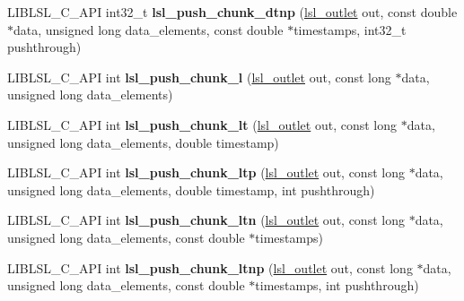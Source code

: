\begin{DoxyCompactItemize}
\item 
\mbox{\label{namespacelsl_a8a0e5cfc6b88e4dae3d4abd97ac47c38}} 
L\+I\+B\+L\+S\+L\+\_\+\+C\+\_\+\+A\+PI int32\+\_\+t {\bfseries lsl\+\_\+push\+\_\+chunk\+\_\+dtnp} (\hyperlink{namespacelsl_abcf512b0f66dacf86c10b165995fd50b}{lsl\+\_\+outlet} out, const double $\ast$data, unsigned long data\+\_\+elements, const double $\ast$timestamps, int32\+\_\+t pushthrough)
\item 
\mbox{\label{namespacelsl_a68403934d1fdace37348c95f54367bc2}} 
L\+I\+B\+L\+S\+L\+\_\+\+C\+\_\+\+A\+PI int {\bfseries lsl\+\_\+push\+\_\+chunk\+\_\+l} (\hyperlink{namespacelsl_abcf512b0f66dacf86c10b165995fd50b}{lsl\+\_\+outlet} out, const long $\ast$data, unsigned long data\+\_\+elements)
\item 
\mbox{\label{namespacelsl_a55622b4fc53149f986414f7642baf00a}} 
L\+I\+B\+L\+S\+L\+\_\+\+C\+\_\+\+A\+PI int {\bfseries lsl\+\_\+push\+\_\+chunk\+\_\+lt} (\hyperlink{namespacelsl_abcf512b0f66dacf86c10b165995fd50b}{lsl\+\_\+outlet} out, const long $\ast$data, unsigned long data\+\_\+elements, double timestamp)
\item 
\mbox{\label{namespacelsl_a1a6be2ac3bc8a1df1f4c08d0b3a79445}} 
L\+I\+B\+L\+S\+L\+\_\+\+C\+\_\+\+A\+PI int {\bfseries lsl\+\_\+push\+\_\+chunk\+\_\+ltp} (\hyperlink{namespacelsl_abcf512b0f66dacf86c10b165995fd50b}{lsl\+\_\+outlet} out, const long $\ast$data, unsigned long data\+\_\+elements, double timestamp, int pushthrough)
\item 
\mbox{\label{namespacelsl_a93cfea6f1ecc01606e6e4f37bba7103f}} 
L\+I\+B\+L\+S\+L\+\_\+\+C\+\_\+\+A\+PI int {\bfseries lsl\+\_\+push\+\_\+chunk\+\_\+ltn} (\hyperlink{namespacelsl_abcf512b0f66dacf86c10b165995fd50b}{lsl\+\_\+outlet} out, const long $\ast$data, unsigned long data\+\_\+elements, const double $\ast$timestamps)
\item 
\mbox{\label{namespacelsl_aa172a29d0976aee8d41306d7b8b53231}} 
L\+I\+B\+L\+S\+L\+\_\+\+C\+\_\+\+A\+PI int {\bfseries lsl\+\_\+push\+\_\+chunk\+\_\+ltnp} (\hyperlink{namespacelsl_abcf512b0f66dacf86c10b165995fd50b}{lsl\+\_\+outlet} out, const long $\ast$data, unsigned long data\+\_\+elements, const double $\ast$timestamps, int pushthrough)
\item 

\end{DoxyCompactItemize}
